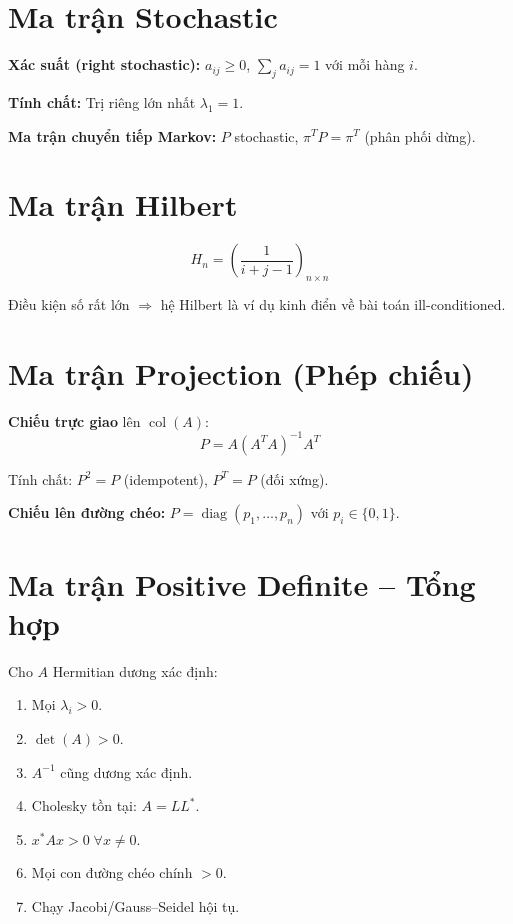 \section{Ma trận Stochastic}

\textbf{Xác suất (right stochastic):} $a_{ij} \ge 0$, \; $\sum_j a_{ij} = 1$ với mỗi hàng $i$.

\textbf{Tính chất:} Trị riêng lớn nhất $\lambda_1 = 1$.

\textbf{Ma trận chuyển tiếp Markov:} $P$ stochastic, $\pi^T P = \pi^T$ (phân phối dừng).

\section{Ma trận Hilbert}

\[
H_n = \left(\frac{1}{i+j-1}\right)_{n \times n}
\]

Điều kiện số rất lớn $\Longrightarrow$ hệ Hilbert là ví dụ kinh điển về bài toán ill-conditioned.

\section{Ma trận Projection (Phép chiếu)}

\textbf{Chiếu trực giao} lên $\operatorname{col}(A)$:
\[
P = A(A^TA)^{-1}A^T
\]

Tính chất: $P^2 = P$ (idempotent), $P^T = P$ (đối xứng).

\textbf{Chiếu lên đường chéo:} $P = \operatorname{diag}(p_1, \dots, p_n)$ với $p_i \in \{0,1\}$.

\section{Ma trận Positive Definite -- Tổng hợp}

Cho $A$ Hermitian dương xác định:
\begin{enumerate}
    \item Mọi $\lambda_i > 0$.
    \item $\det(A) > 0$.
    \item $A^{-1}$ cũng dương xác định.
    \item Cholesky tồn tại: $A = LL^*$.
    \item $x^*Ax > 0 \;\forall x \neq 0$.
    \item Mọi con đường chéo chính $> 0$.
    \item Chạy Jacobi/Gauss--Seidel hội tụ.
\end{enumerate}


